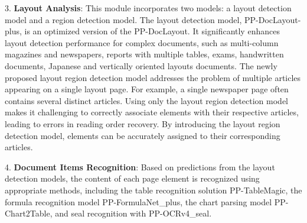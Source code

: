 \documentclass[11pt, a4paper, logo, copyright, nonumbering]{paddleocr}
\begin{document}
3. \textbf{Layout Analysis}: This module incorporates two models: a layout detection model and a region detection model. The layout detection model, PP-DocLayout-plus, is an optimized version of the PP-DocLayout\citep{sun2025pp}. It significantly enhances layout detection performance for complex documents, such as multi-column magazines and newspapers, reports with multiple tables, exams, handwritten documents, Japanese and vertically oriented layouts documents. The newly proposed layout region detection model addresses the problem of multiple articles appearing on a single layout page. For example, a single newspaper page often contains several distinct articles. Using only the layout region detection model makes it challenging to correctly associate elements with their respective articles, leading to errors in reading order recovery. By introducing the layout region detection model, elements can be accurately assigned to their corresponding articles.

4. \textbf{Document Items Recognition}: Based on predictions from the layout detection models, the content of each page element is recognized using appropriate methods, including the table recognition solution PP-TableMagic, the formula recognition model PP-FormulaNet\_plus, the chart parsing model PP-Chart2Table, and seal recognition with PP-OCRv4\_seal.
\end{document}
